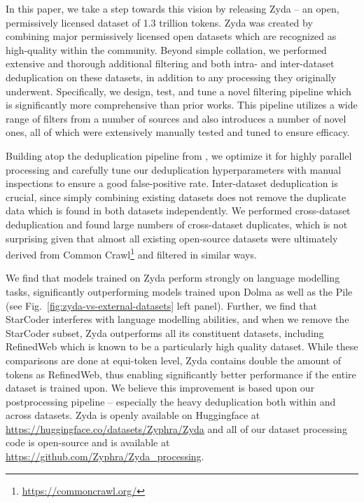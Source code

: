 \documentclass{article}
\begin{document}
In this paper, we take a step towards this vision by releasing Zyda -- an open, permissively licensed dataset of 1.3 trillion tokens. Zyda was created by combining major permissively licensed open datasets which are recognized as high-quality within the community. Beyond simple collation, we performed extensive and thorough additional filtering and both intra- and inter-dataset deduplication on these datasets, in addition to any processing they originally underwent. Specifically, we design, test, and tune a novel filtering pipeline which is significantly more comprehensive than prior works. This pipeline utilizes a wide range of filters from a number of sources \citep{raffel2020exploring,slimpajama,kudugunta2024madlad,penedo2023refinedweb} and also introduces a number of novel ones, all of which were extensively manually tested and tuned to ensure efficacy. 

Building atop the deduplication pipeline from \citep{slimpajama}, we optimize it for highly parallel processing and carefully tune our deduplication hyperparameters with manual inspections to ensure a good false-positive rate. Inter-dataset deduplication is crucial, since simply combining existing datasets does not remove the duplicate data which is found in both datasets independently. We performed cross-dataset deduplication and found large numbers of cross-dataset duplicates, which is not surprising given that almost all existing open-source datasets were ultimately derived from Common Crawl\footnote{\url{https://commoncrawl.org/}} and filtered in similar ways. 

We find that models trained on Zyda perform strongly on language modelling tasks, significantly outperforming models trained upon Dolma as well as the Pile (see Fig.~\ref{fig:zyda-vs-external-datasets} left panel). Further, we find that StarCoder interferes with language modelling abilities, and when we remove the StarCoder subset, Zyda outperforms all its constituent datasets, including RefinedWeb which is known to be a particularly high quality dataset. While these comparisons are done at equi-token level, Zyda contains double the amount of tokens as RefinedWeb, thus enabling significantly better performance if the entire dataset is trained upon. We believe this improvement is based upon our postprocessing pipeline -- especially the heavy deduplication both within and across datasets. Zyda is openly available on Huggingface at \url{https://huggingface.co/datasets/Zyphra/Zyda} and all of our dataset processing code is open-source and is available at \url{https://github.com/Zyphra/Zyda_processing}.
\end{document}
